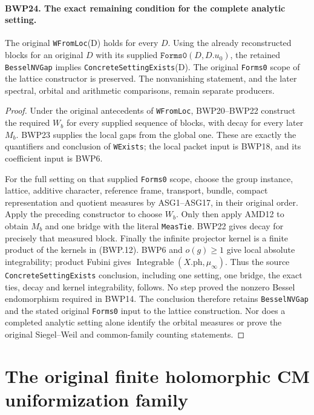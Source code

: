 \documentclass[11pt,a4paper]{article}
\numberwithin{equation}{section}
\theoremstyle{remark}\newtheorem{remark}[theorem]{Remark}
\begin{document}
\paragraph{BWP24. The exact remaining condition for the complete analytic setting.}
\label{claim:BWP24}
The original \texttt{WFrom\allowbreak Loc}(D) holds for every \(D\).
Using the already reconstructed blocks for an original \(D\)
with its supplied \(\texttt{Forms0}(D,D.u_0)\), the retained
\texttt{Bessel\allowbreak NVGap} implies
\texttt{Concrete\allowbreak Setting\allowbreak Exists}(D).  The original \texttt{Forms0}
scope of the lattice constructor is preserved.  The nonvanishing statement,
and the later spectral, orbital and arithmetic comparisons, remain
separate producers.

\begin{proof}
Under the original antecedents of \texttt{WFrom\allowbreak Loc}, BWP20--BWP22
construct the required \(W_b\) for every supplied sequence of
blocks, with decay for every later \(M_b\).  BWP23 supplies the
local gaps from the global one.  These are exactly the quantifiers
and conclusion of \texttt{WExists}; the local packet input is
BWP18, and its coefficient input is BWP6.

For the full setting on that supplied \texttt{Forms0} scope,
choose the group instance, lattice, additive
character, reference frame, transport, bundle, compact representation
and quotient measures by ASG1--ASG17, in their original order.
Apply the preceding constructor to choose \(W_b\).  Only then
apply AMD12 to obtain \(M_b\) and one bridge with the literal
\texttt{Meas\allowbreak Tie}.  BWP22 gives decay for precisely that measured
block.  Finally the infinite projector kernel is a finite product
of the kernels in (BWP.12).  BWP6 and \(o(g)\ge1\) give local
absolute integrability; product Fubini gives
\(\operatorname{Integrable}(X.\mathrm{ph},\mu_\infty)\).
Thus the source \texttt{Concrete\allowbreak Setting\allowbreak Exists} conclusion, including
one setting, one bridge, the exact ties, decay and kernel
integrability, follows.
No step proved the nonzero Bessel endomorphism required in BWP14.
The conclusion therefore retains \texttt{Bessel\allowbreak NVGap} and the
stated original \texttt{Forms0} input to the lattice construction.
Nor does a completed analytic setting alone
identify the orbital measures or prove the original Siegel--Weil
and common-family counting statements.
\end{proof}


\section{The original finite holomorphic CM uniformization family}
\end{document}
